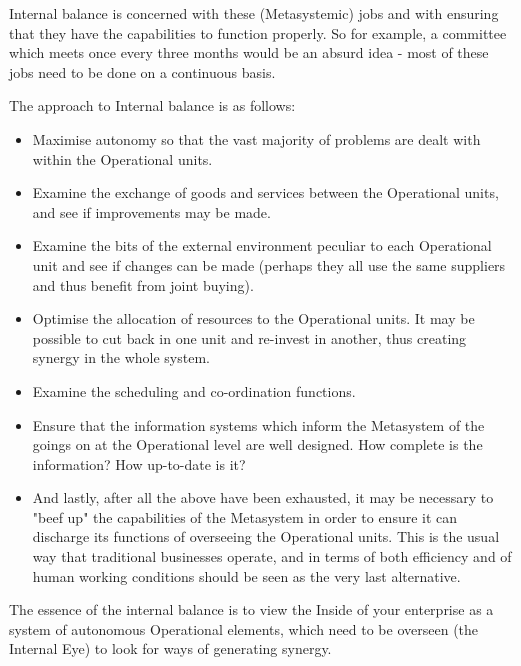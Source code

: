 Internal balance is concerned with these (Metasystemic) jobs and with ensuring that they have the capabilities to function properly. So for example, a committee which meets once every three months would be an absurd idea - most of these jobs need to be done on a continuous basis.

The approach to Internal balance is as follows:

\begin{itemize}
  \item Maximise autonomy so that the vast majority of problems are dealt with within the Operational units.

  \item Examine the exchange of goods and services between the Operational units, and see if improvements may be made.

  \item Examine the bits of the external environment peculiar to each Operational unit and see if changes can be made (perhaps they all use the same suppliers and thus benefit from joint buying).

  \item Optimise the allocation of resources to the Operational units. It may be possible to cut back in one unit and re-invest in another, thus creating synergy in the whole system.

  \item Examine the scheduling and co-ordination functions.

  \item Ensure that the information systems which inform the Metasystem of the goings on at the Operational level are well designed. How complete is the information? How up-to-date is it?

  \item And lastly, after all the above have been exhausted, it may be necessary to "beef up" the capabilities of the Metasystem in order to ensure it can discharge its functions of overseeing the Operational units. This is the usual way that traditional businesses operate, and in terms of both efficiency and of human working conditions should be seen as the very last alternative.

\end{itemize}

The essence of the internal balance is to view the Inside of your enterprise as a system of autonomous Operational elements, which need to be overseen (the Internal Eye) to look for ways of generating synergy.

